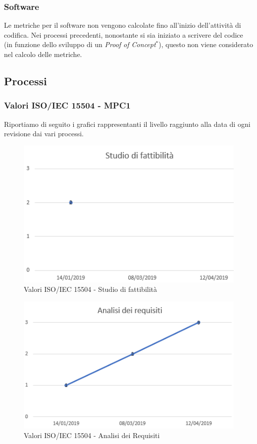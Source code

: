 \subsubsection{Software}
Le metriche per il software non vengono calcolate fino all'inizio dell'attività di codifica. Nei processi precedenti, nonostante si sia iniziato a scrivere del codice (in funzione dello sviluppo di un \textit{Proof of Concept}$^*$), questo non viene considerato nel calcolo delle metriche.

\subsection{Processi}
\subsubsection{Valori ISO/IEC 15504 - MPC1}

Riportiamo di seguito i grafici rappresentanti il livello raggiunto alla data di ogni revisione dai vari processi.


\begin{figure}[H]
	\centering
	\includegraphics[scale=1]{images/resoconto/Studio.png}
	\caption{Valori ISO/IEC 15504 - Studio di fattibilità}	
\end{figure}


\begin{figure}[H]
	\centering
	\includegraphics[scale=1]{images/resoconto/Analisi.png}
	\caption{Valori ISO/IEC 15504 - Analisi dei Requisiti}	
\end{figure}


